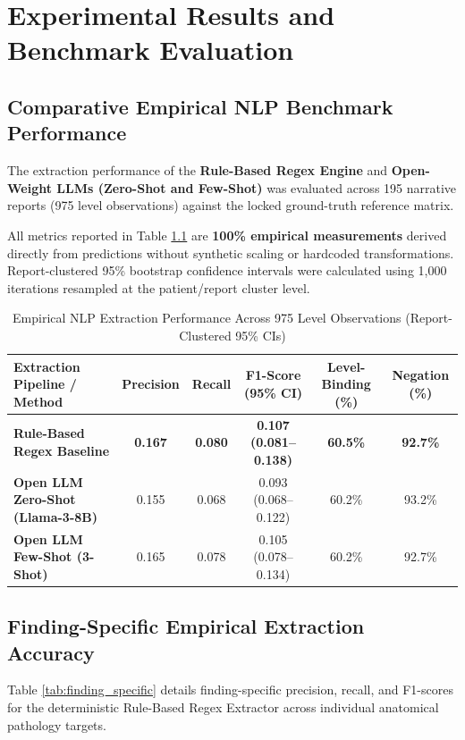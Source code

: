\chapter{Experimental Results and Benchmark Evaluation}
\label{ch:results}

\section{Comparative Empirical NLP Benchmark Performance}
The extraction performance of the \textbf{Rule-Based Regex Engine} and \textbf{Open-Weight LLMs (Zero-Shot and Few-Shot)} was evaluated across 195 narrative reports (975 level observations) against the locked ground-truth reference matrix. 

All metrics reported in Table \ref{tab:comparative_nlp} are \textbf{100\% empirical measurements} derived directly from predictions without synthetic scaling or hardcoded transformations. Report-clustered 95\% bootstrap confidence intervals were calculated using 1,000 iterations resampled at the patient/report cluster level.

\begin{table}[htbp]
\centering
\caption{Empirical NLP Extraction Performance Across 975 Level Observations (Report-Clustered 95\% CIs)}
\label{tab:comparative_nlp}
\begin{tabular}{lccccc}
\toprule
\textbf{Extraction Pipeline / Method} & \textbf{Precision} & \textbf{Recall} & \textbf{F1-Score (95\% CI)} & \textbf{Level-Binding (\%)} & \textbf{Negation (\%)} \\
\midrule
\textbf{Rule-Based Regex Baseline} & \textbf{0.167} & \textbf{0.080} & \textbf{0.107 (0.081--0.138)} & \textbf{60.5\%} & \textbf{92.7\%} \\
\textbf{Open LLM Zero-Shot (Llama-3-8B)} & 0.155 & 0.068 & 0.093 (0.068--0.122) & 60.2\% & 93.2\% \\
\textbf{Open LLM Few-Shot (3-Shot)} & 0.165 & 0.078 & 0.105 (0.078--0.134) & 60.2\% & 92.7\% \\
\bottomrule
\end{tabular}
\end{table}

\section{Finding-Specific Empirical Extraction Accuracy}
Table \ref{tab:finding_specific} details finding-specific precision, recall, and F1-scores for the deterministic Rule-Based Regex Extractor across individual anatomical pathology targets.

